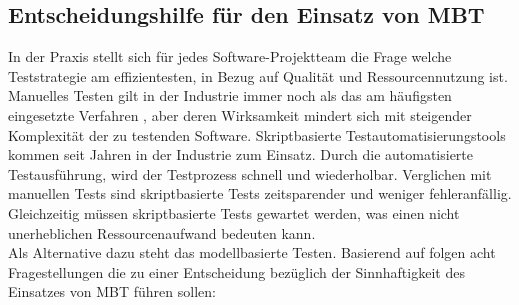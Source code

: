 \subsection{Entscheidungshilfe für den Einsatz von MBT}
In der Praxis stellt sich für jedes Software-Projektteam die Frage welche Teststrategie am effizientesten, in Bezug auf Qualität und Ressourcennutzung ist. Manuelles Testen gilt in der Industrie immer noch als das am häufigsten eingesetzte Verfahren \cite{guldali_starthilfe_2010}, aber deren Wirksamkeit mindert sich mit steigender Komplexität der zu testenden Software. Skriptbasierte Testautomatisierungstools kommen seit Jahren in der Industrie zum Einsatz. Durch die automatisierte Testausführung, wird der Testprozess schnell und wiederholbar. Verglichen mit manuellen Tests sind skriptbasierte Tests zeitsparender und weniger fehleranfällig. Gleichzeitig müssen skriptbasierte Tests gewartet werden, was einen nicht unerheblichen Ressourcenaufwand bedeuten kann.\\
Als Alternative dazu steht das modellbasierte Testen. Basierend auf \cite{guldali_starthilfe_2010} folgen acht Fragestellungen die zu einer Entscheidung bezüglich der Sinnhaftigkeit des Einsatzes von MBT führen sollen:

